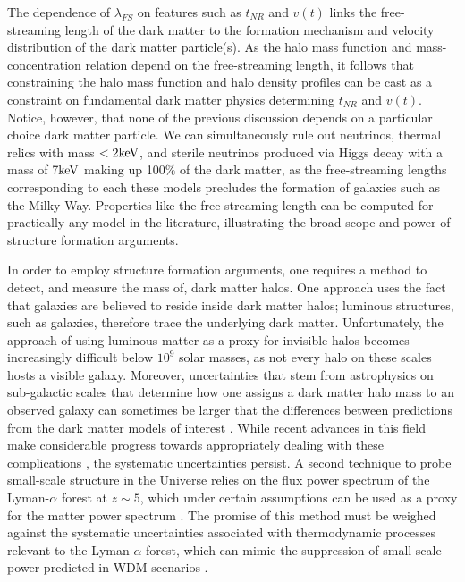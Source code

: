 The dependence of $\lambda_{FS}$ on features such as $t_{NR}$ and $v\left(t\right)$ links the free-streaming length of the dark matter to the formation mechanism and velocity distribution of the dark matter particle(s). As the halo mass function and mass-concentration relation depend on the free-streaming length, it follows that constraining the halo mass function and halo density profiles can be cast as a constraint on fundamental dark matter physics determining $t_{NR}$ and $v\left(t\right)$. Notice, however, that none of the previous discussion depends on a particular choice dark matter particle. We can simultaneously rule out neutrinos, thermal relics with mass $< 2 \rm{keV}$, and sterile neutrinos produced via Higgs decay with a mass of $7 \rm{keV}$ \citep{Viel13,AbazaijanKusenko19} making up 100$\%$ of the dark matter, as the free-streaming lengths corresponding to each these models precludes the formation of galaxies such as the Milky Way. Properties like the free-streaming length can be computed for practically any model in the literature, illustrating the broad scope and power of structure formation arguments. 

In order to employ structure formation arguments, one requires a method to detect, and measure the mass of, dark matter halos. One approach uses the fact that galaxies are believed to reside inside dark matter halos; luminous structures, such as galaxies, therefore trace the underlying dark matter. Unfortunately, the approach of using luminous matter as a proxy for invisible halos becomes increasingly difficult below $10^9$ solar masses, as not every halo on these scales hosts a visible galaxy. Moreover, uncertainties that stem from astrophysics on sub-galactic scales that determine how one assigns a dark matter halo mass to an observed galaxy can sometimes be larger that the differences between predictions from the dark matter models of interest \citep{Nierenberg++16}. While recent advances in this field make considerable progress towards appropriately dealing with these complications \citep{Nadler++19}, the systematic uncertainties persist. A second technique to probe small-scale structure in the Universe relies on the flux power spectrum of the Lyman-$\alpha$ forest at $z \sim 5$, which under certain assumptions can be used as a proxy for the matter power spectrum \citep{Viel13,Irsic++17}. The promise of this method must be weighed against the systematic uncertainties associated with thermodynamic processes relevant to the Lyman-$\alpha$ forest, which can mimic the suppression of small-scale power predicted in WDM scenarios \citep{Garzilli++19}. 

